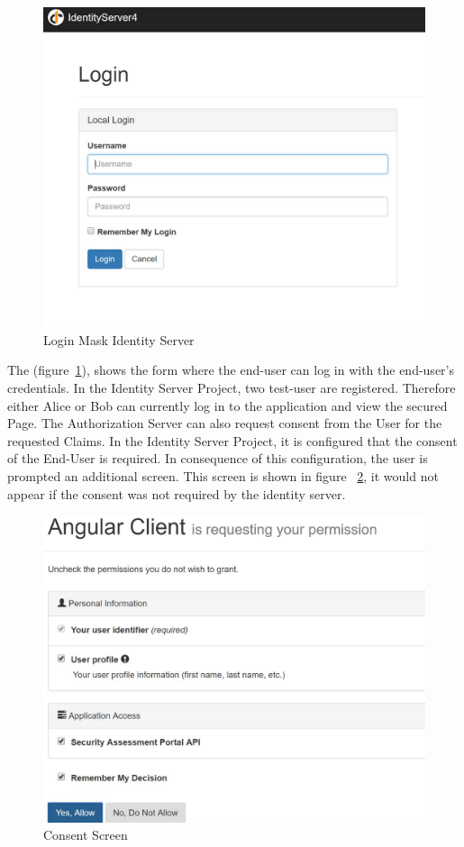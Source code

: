 \begin{figure}[h]
	\centering
	\includegraphics[width=0.7\linewidth]{images/login_identity_server}
	\caption{Login Mask Identity Server}
	\label{fig:loginidentityserver}
\end{figure}


The (figure~\ref{fig:loginidentityserver}), shows the form where the end-user can log in with the end-user’s credentials. In the Identity Server Project, two test-user are registered. Therefore either Alice or Bob can currently log in to the application and view the secured Page. 
The Authorization Server can also request consent from the User for the requested Claims. In the Identity Server Project, it is configured that the consent of the End-User is required. In consequence of this configuration, the user is prompted an additional screen. This screen is shown in figure~ \ref{fig:consentscreen}, it would not appear if the consent was not required by the identity server. 

\begin{figure}[h]
	\centering
	\includegraphics[width=0.7\linewidth]{images/consent_screen}
	\caption{Consent Screen}
	\label{fig:consentscreen}
\end{figure}


